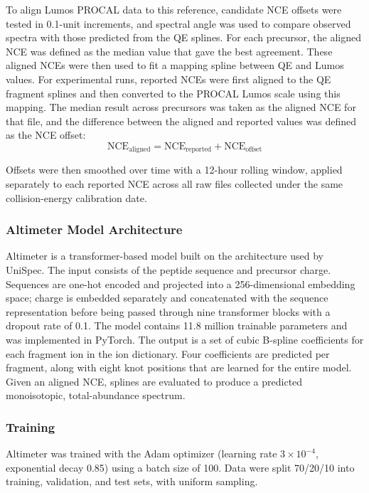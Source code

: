 \documentclass[pdflatex,sn-nature]{sn-jnl}
\begin{document}
To align Lumos PROCAL data to this reference, candidate NCE offsets were tested in 0.1-unit increments, and spectral angle was used to compare observed spectra with those predicted from the QE splines. For each precursor, the aligned NCE was defined as the median value that gave the best agreement. These aligned NCEs were then used to fit a mapping spline between QE and Lumos values.
For experimental runs, reported NCEs were first aligned to the QE fragment splines and then converted to the PROCAL Lumos scale using this mapping. The median result across precursors was taken as the aligned NCE for that file, and the difference between the aligned and reported values was defined as the NCE offset:
\begin{equation} 
    \text{NCE}_{\text{aligned}} = \text{NCE}_{\text{reported}} + \text{NCE}_{\text{offset}}
\end{equation}

Offsets were then smoothed over time with a 12-hour rolling window, applied separately to each reported NCE across all raw files collected under the same collision-energy calibration date.

\subsubsection{Altimeter Model Architecture}
Altimeter is a transformer-based model built on the architecture used by UniSpec. The input consists of the peptide sequence and precursor charge. Sequences are one-hot encoded and projected into a 256-dimensional embedding space; charge is embedded separately and concatenated with the sequence representation before being passed through nine transformer blocks with a dropout rate of 0.1. The model contains 11.8 million trainable parameters and was implemented in PyTorch.
The output is a set of cubic B-spline coefficients for each fragment ion in the ion dictionary. Four coefficients are predicted per fragment, along with eight knot positions that are learned for the entire model. Given an aligned NCE, splines are evaluated to produce a predicted monoisotopic, total-abundance spectrum.

\subsubsection{Training}
Altimeter was trained with the Adam optimizer (learning rate $3\times10^{-4}$, exponential decay 0.85) using a batch size of 100. Data were split 70/20/10 into training, validation, and test sets, with uniform sampling.  
\end{document}
